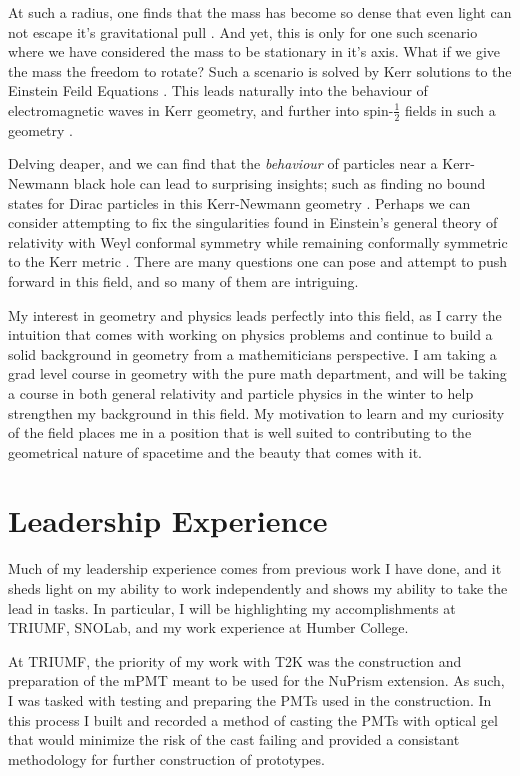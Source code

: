 \documentclass[12pt]{article}
\begin{document}
At such a radius, one finds that the mass has become so dense that even light can not escape it's gravitational pull \cite{gr}. And yet, this is only for one such scenario where we have considered the mass to be stationary in it's axis. What if we give the mass the freedom to rotate? Such a scenario is solved by Kerr solutions to the Einstein Feild Equations \cite{mbh}. This leads naturally into the behaviour of electromagnetic waves in Kerr geometry, and further into spin-$\frac{1}{2}$ fields in such a geometry \cite{mbh}.

Delving deaper, and we can find that the \textit{behaviour} of particles near a Kerr-Newmann black hole can lead to surprising insights; such as finding no bound states for Dirac particles in this Kerr-Newmann geometry \cite{cpam}\cite{atmp}. Perhaps we can consider attempting to fix the singularities found in Einstein's general theory of relativity with Weyl conformal symmetry while remaining conformally symmetric to the Kerr metric \cite{confgrav}. There are many questions one can pose and attempt to push forward in this field, and so many of them are intriguing.

My interest in geometry and physics leads perfectly into this field, as I carry the intuition that comes with working on physics problems and continue to build a solid background in geometry from a mathemiticians perspective. I am taking a grad level course in geometry with the pure math department, and will be taking a course in both general relativity and particle physics in the winter to help strengthen my background in this field. My motivation to learn and my curiosity of the field places me in a position that is well suited to contributing to the geometrical nature of spacetime and the beauty that comes with it.

\section{Leadership Experience}

Much of my leadership experience comes from previous work I have done, and it sheds light on my ability to work independently and shows my ability to take the lead in tasks. In particular, I will be highlighting my accomplishments at TRIUMF, SNOLab, and my work experience at Humber College.

At TRIUMF, the priority of my work with T2K was the construction and preparation of the mPMT meant to be used for the NuPrism extension. As such, I was tasked with testing and preparing the PMTs used in the construction. In this process I built and recorded a method of casting the PMTs with optical gel that would minimize the risk of the cast failing and provided a consistant methodology for further construction of prototypes.
\end{document}
